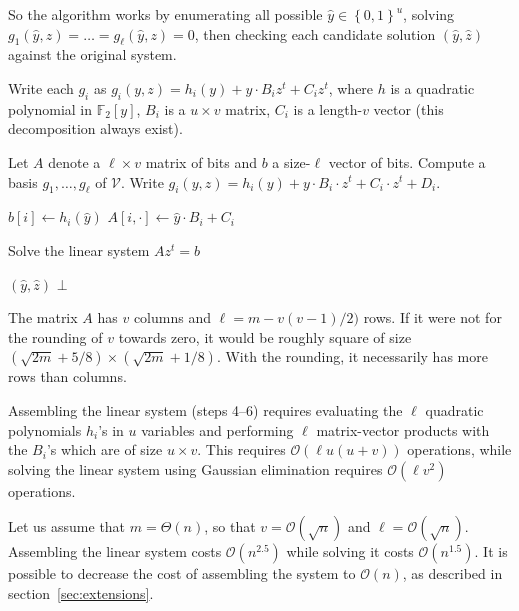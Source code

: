 \documentclass[a4paper,UKenglish,cleveref, autoref]{lipics-v2019}
\newcommand{\bits}{\left\{0, 1\right\}}
\newcommand{\bigO}[1]{\ensuremath{\mathcal{O}\left( #1 \right)} }
\newcommand{\bigTheta}[1]{\ensuremath{\Theta\left( #1 \right)} }
\begin{document}
So the algorithm works by enumerating all possible $\hat y \in \bits^u$, solving
$g_1(\hat y, z) = \dots = g_\ell(\hat y, z) = 0$, then checking each candidate
solution $(\hat y, \hat z)$ against the original system.

Write each $g_i$ as $g_i(y, z) = h_i(y) + y \cdot B_i z^t + C_i z^t$, where $h$ is
a quadratic polynomial in $\mathbb{F}_2[y]$, $B_i$ is a $u \times v$ matrix,
$C_i$ is a length-$v$ vector (this decomposition always exist).

\begin{algorithm}
  \caption{}
\begin{algorithmic}[1]
  \State Let $A$ denote a $\ell \times v$ matrix of bits and $b$ a size-$\ell$
  vector of bits.  \State Compute a basis $g_1, \dots, g_\ell$ of $\mathcal{V}$.
  \State Write
  $g_i(y, z) = h_i(y) + y\cdot B_i \cdot z^t + C_i \cdot z^t + D_i$.
  \For{$\hat y \in \bits^u$}

  \State $b[i] \gets  h_i(\hat y)$
  \State $A[i, \cdot] \gets \hat y \cdot B_i + C_i$
  \EndFor

  \State Solve the linear system $Az^t = b$

  \State \Return $(\hat y, \hat z)$
  \EndIf
  \EndFor
  \EndFor
  \State \Return $\bot$
\end{algorithmic}
\end{algorithm}

The matrix $A$ has $v$ columns and $\ell = m - v(v-1)/2)$ rows. If it were not
for the rounding of $v$ towards zero, it would be roughly square of size
$(\sqrt{2m} + 5/8) \times (\sqrt{2m} + 1/8)$. With the rounding, it necessarily
has more rows than columns.

Assembling the linear system (steps 4--6) requires evaluating the $\ell$
quadratic polynomials $h_i$'s in $u$ variables and performing $\ell$
matrix-vector products with the $B_i$'s which are of size $u \times v$.  This
requires $\bigO{\ell u(u+v)}$ operations, while solving the linear system using
Gaussian elimination requires $\bigO{\ell v^2}$ operations.

Let us assume that $m = \bigTheta{n}$, so that $v = \bigO{\sqrt{n}}$ and
$\ell = \bigO{\sqrt{n}}$. Assembling the linear system costs $\bigO{n^{2.5}}$
while solving it costs $\bigO{n^{1.5}}$. It is possible to decrease the cost of
assembling the system to $\bigO{n}$, as described in
section~\ref{sec:extensions}.
\end{document}
